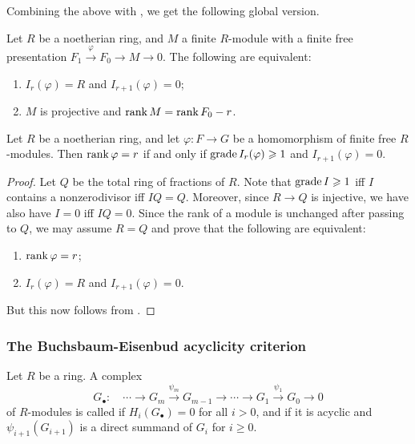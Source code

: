 \documentclass[12pt]{article}
\begin{document}
Combining the above with , we get the following global version.
\begin{prop} \label{prop:projective-rank-using-presentation}
	Let $R$ be a noetherian ring, and $M$ a finite $R$-module with a finite free presentation $F_{1} \xrightarrow{\varphi} F_{0} \to M \to 0$. The following are equivalent:
	\begin{enumerate}[label=(\alph*)]
		\item $I_{r}(\varphi) = R$ and $I_{r + 1}(\varphi) = 0$;
		\item $M$ is projective and $\operatorname{rank} M = \operatorname{rank} F_{0} - r$.
	\end{enumerate}
\end{prop}

\begin{prop}
	Let $R$ be a noetherian ring, and let $\varphi : F \to G$ be a homomorphism of finite free $R$-modules. Then $\operatorname{rank} \varphi = r$ if and only if $\operatorname{grade} I_{r}(\varphi) \geqslant 1$ and $I_{r + 1}(\varphi) = 0$.
\end{prop}
\begin{proof} 
	Let $Q$ be the total ring of fractions of $R$. Note that $\operatorname{grade} I \geqslant 1$ iff $I$ contains a nonzerodivisor iff $IQ = Q$. Moreover, since $R \to Q$ is injective, we have also have $I = 0$ iff $IQ = 0$. \newline
	Since the rank of a module is unchanged after passing to $Q$, we may assume $R = Q$ and prove that the following are equivalent:
	\begin{enumerate}[label=(\alph*)]
		\item $\operatorname{rank} \varphi = r$;
		\item $I_{r}(\varphi) = R$ and $I_{r + 1}(\varphi) = 0$.
	\end{enumerate}
	But this now follows from .
\end{proof}

\subsubsection{The Buchsbaum-Eisenbud acyclicity criterion}

\begin{defn}
	Let $R$ be a ring. A complex
	\begin{equation*} 
		G_{\bullet}: \quad \cdots \to G_{m} \xrightarrow{\psi_{m}} G_{m - 1} \to \cdots \to G_{1} \xrightarrow{\psi_{1}} G_{0} \to 0
	\end{equation*}
	of $R$-modules is called  if $H_{i}(G_{\bullet}) = 0$ for all $i > 0$, and  if it is acyclic and $\psi_{i + 1}(G_{i + 1})$ is a direct summand of $G_{i}$ for $i \ge 0$.
\end{defn}
\end{document}
